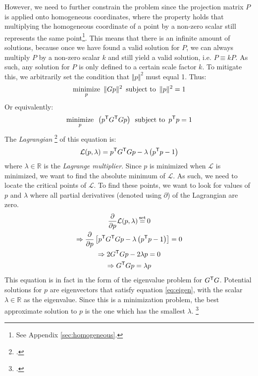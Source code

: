 However, we need to further constrain the problem since the projection matrix $P$ is applied onto homogeneous coordinates, where the property holds that multiplying the homogeneous coordinate of a point by a non-zero scalar still represents the same point\footnote{See Appendix \ref{sec:homogeneous}.}. This means that there is an infinite amount of solutions, because once we have found a valid solution for $P$, we can always multiply $P$ by a non-zero scalar $k$ and still yield a valid solution, i.e. $P \equiv kP$. As such, any solution for $P$ is only defined to a certain scale factor $k$. To mitigate this, we arbitrarily set the condition that $\Vert p \Vert^2$ must equal 1. Thus:
\begin{equation*} \label{eq:min1}
    \underset{p}{\text{minimize}}\enspace \lVert Gp \rVert^2 \enspace \text{subject to} \enspace \lVert p \rVert^2 = 1
\end{equation*}
Or equivalently:
\begin{equation} \label{eq:min2}
    \underset{p}{\text{minimize}}\enspace \left(p^{\mathsf{T}} G^{\mathsf{T}} Gp\right) \enspace \text{subject to} \enspace p^{\mathsf{T}} p = 1
\end{equation}
The \emph{Lagrangian} \footcite[][2]{ghojoghEigenvalueGeneralized2023} of this equation is:
\begin{equation}
    \mathcal{L}(p, \lambda) = p^{\mathsf{T}} G^{\mathsf{T}} Gp - \lambda \left( p^{\mathsf{T}} p - 1 \right)
\end{equation}
where $\lambda \in \mathbb{R}$ is the \emph{Lagrange multiplier}. Since $p$ is minimized when $\mathcal{L}$ is minimized, we want to find the absolute minimum of $\mathcal{L}$. As such, we need to locate the critical points of $\mathcal{L}$. To find these points, we want to look for values of $p$ and $\lambda$ where all partial derivatives (denoted using $\partial$) of the Lagrangian are zero.
\begin{gather}
    \frac{\partial}{\partial p}\mathcal{L}(p, \lambda) \seteq 0 \nonumber\\
    \Rightarrow \frac{\partial}{\partial p} \left[ p^\T G^\T Gp - \lambda \left( p^\T p - 1 \right) \right] = 0 \nonumber \\
    \Rightarrow 2G^\T Gp - 2 \lambda p = 0 \nonumber \\
    \Rightarrow G^\T Gp = \lambda p \label{eq:eigen}
\end{gather}
This equation is in fact in the form of the eigenvalue problem for $G^{\mathsf{T}} G$. Potential solutions for $p$ are eigenvectors that satisfy equation \ref{eq:eigen}, with the scalar $\lambda \in \mathbb{R}$ as the eigenvalue. Since this is a minimization problem, the best approximate solution to $p$ is the one which has the smallest $\lambda$. \footcite[][2]{ghojoghEigenvalueGeneralized2023}
